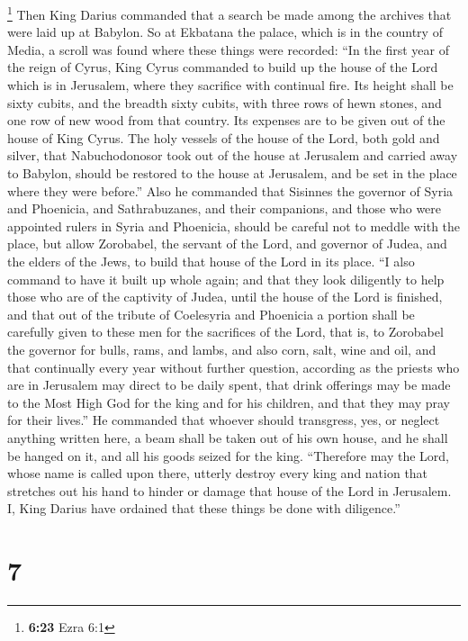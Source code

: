  \footnote{\textbf{6:23} Ezra 6:1} Then King Darius
commanded that a search be made among the archives that were laid up at
Babylon. So at Ekbatana the palace, which is in the country of Media, a
scroll was found where these things were recorded:  ``In
the first year of the reign of Cyrus, King Cyrus commanded to build up
the house of the Lord which is in Jerusalem, where they sacrifice with
continual fire.  Its height shall be sixty cubits, and
the breadth sixty cubits, with three rows of hewn stones, and one row of
new wood from that country. Its expenses are to be given out of the
house of King Cyrus.  The holy vessels of the house of
the Lord, both gold and silver, that Nabuchodonosor took out of the
house at Jerusalem and carried away to Babylon, should be restored to
the house at Jerusalem, and be set in the place where they were
before.''  Also he commanded that Sisinnes the governor
of Syria and Phoenicia, and Sathrabuzanes, and their companions, and
those who were appointed rulers in Syria and Phoenicia, should be
careful not to meddle with the place, but allow Zorobabel, the servant
of the Lord, and governor of Judea, and the elders of the Jews, to build
that house of the Lord in its place.  ``I also command to
have it built up whole again; and that they look diligently to help
those who are of the captivity of Judea, until the house of the Lord is
finished,  and that out of the tribute of Coelesyria and
Phoenicia a portion shall be carefully given to these men for the
sacrifices of the Lord, that is, to Zorobabel the governor for bulls,
rams, and lambs,  and also corn, salt, wine and oil, and
that continually every year without further question, according as the
priests who are in Jerusalem may direct to be daily spent,
 that drink offerings may be made to the Most High God
for the king and for his children, and that they may pray for their
lives.''  He commanded that whoever should transgress,
yes, or neglect anything written here, a beam shall be taken out of his
own house, and he shall be hanged on it, and all his goods seized for
the king.  ``Therefore may the Lord, whose name is called
upon there, utterly destroy every king and nation that stretches out his
hand to hinder or damage that house of the Lord in Jerusalem.
 I, King Darius have ordained that these things be done
with diligence.''

\hypertarget{section-6}{%
\section{7}\label{section-6}}

